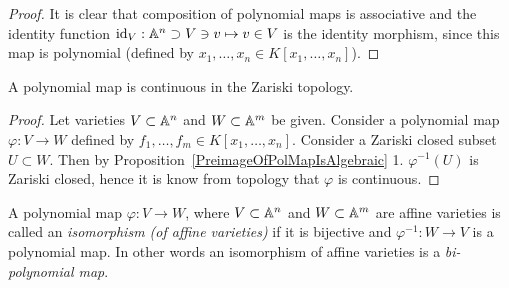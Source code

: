 \begin{proof}
    It is clear that composition of polynomial maps is associative and the identity function $\text{id}_V:\mathbb{A}^n \supset V\ni v\mapsto v\in V$ is the identity morphism, since this map is polynomial (defined by $x_1,\dots,x_n\in K[x_1,\dots,x_n]$).
\end{proof}
\begin{proposition}
    A polynomial map is continuous in the Zariski topology.
\end{proposition}
\begin{proof}
    Let varieties $V\subset \mathbb{A}^n$ and $W\subset \mathbb{A}^m$ be given. Consider a polynomial map $\varphi : V\rightarrow W$ defined by $f_1,\dots,f_m\in K[x_1,\dots,x_n]$. Consider a Zariski closed subset $U\subset W$. Then by Proposition~\ref{PreimageOfPolMapIsAlgebraic} 1. $\varphi^{-1}(U)$ is Zariski closed, hence it is know from topology that $\varphi$ is continuous. 
\end{proof}
\begin{definition}
    A polynomial map $\varphi: V\rightarrow W$, where $V\subset \mathbb{A}^n$ and $W\subset \mathbb{A}^m$ are affine varieties is called an \textit{isomorphism (of affine varieties)} if it is bijective and $\varphi^{-1} : W \rightarrow V$ is a polynomial map. In other words an isomorphism of affine varieties is a \textit{bi-polynomial map}.
\end{definition}

